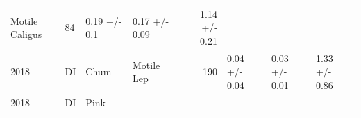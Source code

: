 \documentclass[fleqn,10pt]{wlpeerj} %
\begin{document}
\begin{longtable}[]{@{}llllrlll@{}}
\begin{minipage}[t]{0.11\columnwidth}
Motile Caligus\strut
\end{minipage} & \begin{minipage}[t]{0.04\columnwidth}\raggedleft\strut
84\strut
\end{minipage} & \begin{minipage}[t]{0.14\columnwidth}\raggedright\strut
0.19 +/- 0.1\strut
\end{minipage} & \begin{minipage}[t]{0.14\columnwidth}\raggedright\strut
0.17 +/- 0.09\strut
\end{minipage} & \begin{minipage}[t]{0.14\columnwidth}\raggedright\strut
1.14 +/- 0.21\strut
\end{minipage}\tabularnewline
\begin{minipage}[t]{0.09\columnwidth}\raggedright\strut
2018\strut
\end{minipage} & \begin{minipage}[t]{0.06\columnwidth}\raggedright\strut
DI\strut
\end{minipage} & \begin{minipage}[t]{0.06\columnwidth}\raggedright\strut
Chum\strut
\end{minipage} & \begin{minipage}[t]{0.11\columnwidth}\raggedright\strut
Motile Lep\strut
\end{minipage} & \begin{minipage}[t]{0.04\columnwidth}\raggedleft\strut
190\strut
\end{minipage} & \begin{minipage}[t]{0.14\columnwidth}\raggedright\strut
0.04 +/- 0.04\strut
\end{minipage} & \begin{minipage}[t]{0.14\columnwidth}\raggedright\strut
0.03 +/- 0.01\strut
\end{minipage} & \begin{minipage}[t]{0.14\columnwidth}\raggedright\strut
1.33 +/- 0.86\strut
\end{minipage}\tabularnewline
\begin{minipage}[t]{0.09\columnwidth}\raggedright\strut
2018\strut
\end{minipage} & \begin{minipage}[t]{0.06\columnwidth}\raggedright\strut
DI\strut
\end{minipage} & \begin{minipage}[t]{0.06\columnwidth}\raggedright\strut
Pink\strut
\end{minipage} & \begin{minipage}[t]{0.11\columnwidth}\raggedright\strut

\end{minipage}
\end{longtable}
\end{document}
